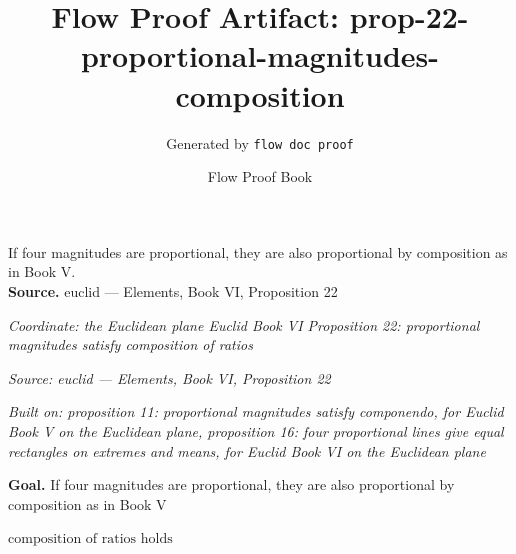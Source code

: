 \documentclass[11pt]{article}
\title{Flow Proof Artifact: prop-22-proportional-magnitudes-composition}
\author{Generated by \texttt{flow doc proof}}
\date{Flow Proof Book}
\theoremstyle{definition}
\begin{document}
\maketitle
If four magnitudes are proportional, they are also proportional by composition as in Book V.\\[0.5em]
\textbf{Source.} euclid — Elements, Book VI, Proposition 22\\[0.5em]
\bigskip
{}\par
\smallskip\noindent\textit{Coordinate: the Euclidean plane \cdot Euclid Book VI \cdot Proposition 22: proportional magnitudes satisfy composition of ratios}\par
\smallskip\noindent\textit{Source: euclid — Elements, Book VI, Proposition 22}\par
\smallskip\noindent\textit{Built on: proposition 11: proportional magnitudes satisfy componendo, for Euclid Book V on the Euclidean plane, proposition 16: four proportional lines give equal rectangles on extremes and means, for Euclid Book VI on the Euclidean plane}\par
\medskip
\noindent\textbf{Goal.} If four magnitudes are proportional, they are also proportional by composition as in Book V\par
\noindent$\displaystyle \text{composition of ratios holds}$\par
\medskip
\noindent
\end{document}
